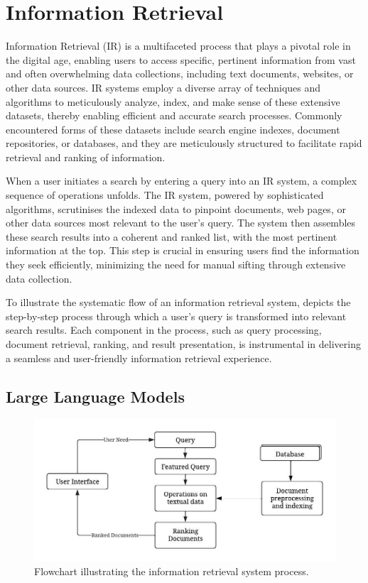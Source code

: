 \section{Information Retrieval}
Information Retrieval (IR) is a multifaceted process that plays a pivotal role in the digital age, enabling users to access specific, pertinent information from vast and often overwhelming data collections, including text documents, websites, or other data sources. IR systems employ a diverse array of techniques and algorithms to meticulously analyze, index, and make sense of these extensive datasets, thereby enabling efficient and accurate search processes. Commonly encountered forms of these datasets include search engine indexes, document repositories, or databases, and they are meticulously structured to facilitate rapid retrieval and ranking of information.

When a user initiates a search by entering a query into an IR system, a complex sequence of operations unfolds. The IR system, powered by sophisticated algorithms, scrutinises the indexed data to pinpoint documents, web pages, or other data sources most relevant to the user's query. The system then assembles these search results into a coherent and ranked list, with the most pertinent information at the top. This step is crucial in ensuring users find the information they seek efficiently, minimizing the need for manual sifting through extensive data collection.

To illustrate the systematic flow of an information retrieval system,  depicts the step-by-step process through which a user's query is transformed into relevant search results. Each component in the process, such as query processing, document retrieval, ranking, and result presentation, is instrumental in delivering a seamless and user-friendly information retrieval experience.

\subsection{Large Language Models}
\begin{figure}
    \centering
    \includegraphics[width=\textwidth]{2Background/Background/IR.jpeg}
    \caption{Flowchart illustrating the information retrieval system process.}
    \label{fig:pipelines}
\end{figure}

